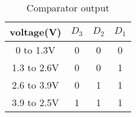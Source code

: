 \begin{table}[H]
    \centering
    \begin{tabular}{|c|c|c|c|}
    \hline
       
        voltage(V) & $D_3$ & $D_2$ & $D_1$\\ \hline
        0 to 1.3V & 0 & 0 & 0 \\ \hline
        1.3 to 2.6V & 0 & 0 & 1 \\ \hline
        2.6 to 3.9V & 0 & 1 & 1 \\ \hline
        3.9 to 2.5V & 1 & 1 & 1 \\ \hline
    \end{tabular}
    \caption{Comparator output}
	\label{tab:2}
\end{table}